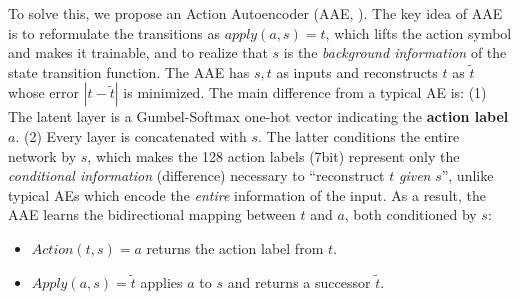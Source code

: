 \documentclass[11pt]{article}
\begin{document}
To solve this, we propose an Action Autoencoder (AAE, ). %
The key idea of AAE is to reformulate the transitions as $apply(a,s)=t$, which lifts the action symbol and makes it trainable,
and to realize that $s$ is the \emph{background information} of the state transition function.
The AAE has $s,t$ as inputs and reconstructs $t$ as $\tilde{t}$ whose error $|t-\tilde{t}|$ is minimized.
The main difference from a typical AE is:
(1) The latent layer is a Gumbel-Softmax one-hot vector indicating the \textbf{action label} $a$. %
(2) Every layer is concatenated with $s$.
The latter conditions the entire network by $s$,
which makes the 128 action labels (7bit) represent only the \emph{conditional information} (difference) necessary to ``reconstruct $t$ \emph{given} $s$'',
unlike typical AEs which encode the \emph{entire} information of the input.
% 
As a result, the AAE learns the bidirectional mapping between $t$ and $a$, both conditioned by $s$:
\begin{itemize}
\setlength{\itemsep}{-0.3em}
 \item $Action(t,s)=a$ returns the action label from $t$.
 \item $Apply(a,s)=\tilde{t}$ applies $a$ to $s$ and returns a successor $\tilde{t}$. 
\end{itemize}
\end{document}
